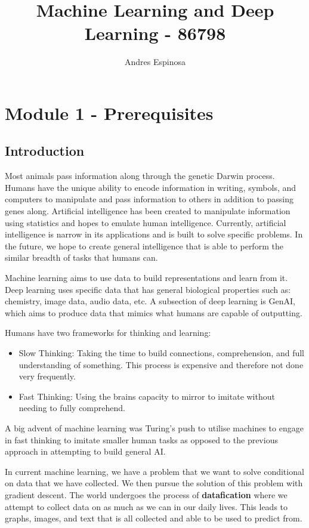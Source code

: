 \documentclass[11pt]{article}
\title{Machine Learning and Deep Learning - 86798}
\author{Andres Espinosa}
\begin{document}
\pgfplotsset{compat=1.18}
\maketitle

\tableofcontents

\section{Module 1 - Prerequisites}

\subsection{Introduction}
Most animals pass information along through the genetic Darwin process.
Humans have the unique ability to encode information in writing, symbols, and computers to manipulate and pass information to others in addition to passing genes along.
Artificial intelligence has been created to manipulate information using statistics and hopes to emulate human intelligence.
Currently, artificial intelligence is narrow in its applications and is built to solve specific problems.
In the future, we hope to create general intelligence that is able to perform the similar breadth of tasks that humans can.

Machine learning aims to use data to build representations and learn from it.
Deep learning uses specific data that has general biological properties such as: chemistry, image data, audio data, etc.
A subsection of deep learning is GenAI, which aims to produce data that mimics what humans are capable of outputting.

Humans have two frameworks for thinking and learning:
\begin{itemize}
    \item Slow Thinking: Taking the time to build connections, comprehension, and full understanding of something. This process is expensive and therefore not done very frequently.
    \item Fast Thinking: Using the brains capacity to mirror to imitate without needing to fully comprehend.
\end{itemize}
A big advent of machine learning was Turing's push to utilise machines to engage in fast thinking to imitate smaller human tasks as opposed to the previous approach in attempting to build general AI.

In current machine learning, we have a problem that we want to solve conditional on data that we have collected.
We then pursue the solution of this problem with gradient descent.
The world undergoes the process of \textbf{datafication} where we attempt to collect data on as much as we can in our daily lives.
This leads to graphs, images, and text that is all collected and able to be used to predict from.
\end{document}
